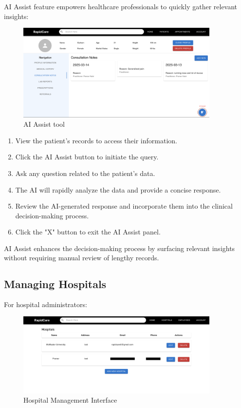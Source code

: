 \documentclass[12pt, titlepage]{article}
\begin{document}
AI Assist feature empowers healthcare professionals to quickly gather relevant insights:

\begin{figure}[H]
\centering
\includegraphics[width=0.9\textwidth]{AI.png}
\caption{AI Assist tool}
\label{fig:AI Assist tool}
\end{figure}

\begin{enumerate} 
\item View the patient's records to access their information. 
\item Click the AI Assist button to initiate the query. 
\item Ask any question related to the patient's data.
\item The AI will rapidly analyze the data and provide a concise response. 
\item Review the AI-generated response and incorporate them into the clinical decision-making process. 
\item Click the "X" button to exit the AI Assist panel.
\end{enumerate}

AI Assist enhances the decision-making process by surfacing relevant insights without requiring manual review of lengthy records.


\subsection{Managing Hospitals}
For hospital administrators:

\begin{figure}[H]
\centering
\includegraphics[width=0.9\textwidth]{hospital.png}
\caption{Hospital Management Interface}
\label{fig:Hospital Management Interface}
\end{figure}
\end{document}
